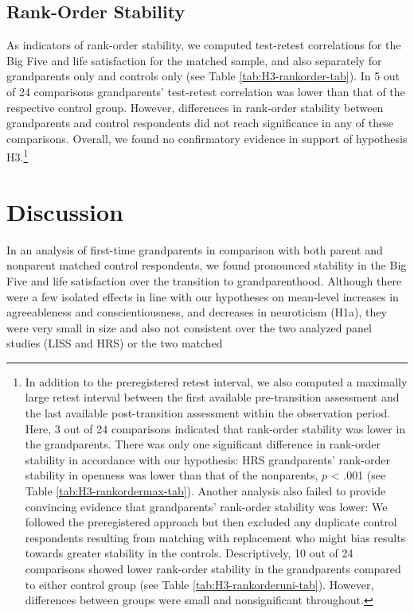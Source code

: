 \documentclass[
  english,
  man,floatsintext]{apa7}
\begin{document}
\hypertarget{rank-order-stability}{%
\subsection{Rank-Order Stability}\label{rank-order-stability}}

As indicators of rank-order stability, we computed test-retest correlations for the Big Five and life satisfaction for the matched sample, and also separately for grandparents only and controls only (see Table \ref{tab:H3-rankorder-tab}). In 5 out of 24 comparisons grandparents' test-retest correlation was lower than that of the respective control group. However, differences in rank-order stability between grandparents and control respondents did not reach significance in any of these comparisons. Overall, we found no confirmatory evidence in support of hypothesis H3.\footnote{In addition to the preregistered retest interval, we also computed a maximally large retest interval between the first available pre-transition assessment and the last available post-transition assessment within the observation period. Here, 3 out of 24 comparisons indicated that rank-order stability was lower in the grandparents. There was only one significant difference in rank-order stability in accordance with our hypothesis: HRS grandparents' rank-order stability in openness was lower than that of the nonparents, \(p\) \textless{} .001 (see Table \ref{tab:H3-rankordermax-tab}). Another analysis also failed to provide convincing evidence that grandparents' rank-order stability was lower: We followed the preregistered approach but then excluded any duplicate control respondents resulting from matching with replacement who might bias results towards greater stability in the controls. Descriptively, 10 out of 24 comparisons showed lower rank-order stability in the grandparents compared to either control group (see Table \ref{tab:H3-rankorderuni-tab}). However, differences between groups were small and nonsignificant throughout.}

\hypertarget{discussion}{%
\section{Discussion}\label{discussion}}

In an analysis of first-time grandparents in comparison with both parent and nonparent matched control respondents, we found pronounced stability in the Big Five and life satisfaction over the transition to grandparenthood. Although there were a few isolated effects in line with our hypotheses on mean-level increases in agreeableness and conscientiousness, and decreases in neuroticism (H1a), they were very small in size and also not consistent over the two analyzed panel studies (LISS and HRS) or the two matched
\end{document}
